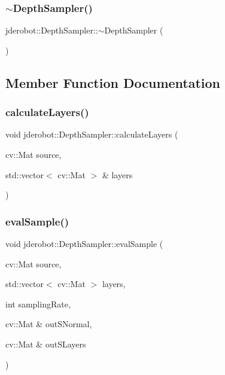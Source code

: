 \subsubsection{\texorpdfstring{$\sim$\+Depth\+Sampler()}{~DepthSampler()}}
{\footnotesize\ttfamily jderobot\+::\+Depth\+Sampler\+::$\sim$\+Depth\+Sampler (\begin{DoxyParamCaption}{ }\end{DoxyParamCaption})\hspace{0.3cm}{\ttfamily [virtual]}}



\subsection{Member Function Documentation}
\mbox{\label{classjderobot_1_1_depth_sampler_abd92df0e1e72431b2297344ff6d7dd78}} 
\subsubsection{\texorpdfstring{calculate\+Layers()}{calculateLayers()}}
{\footnotesize\ttfamily void jderobot\+::\+Depth\+Sampler\+::calculate\+Layers (\begin{DoxyParamCaption}\item[{cv\+::\+Mat}]{source,  }\item[{std\+::vector$<$ cv\+::\+Mat $>$ \&}]{layers }\end{DoxyParamCaption})}

\mbox{\label{classjderobot_1_1_depth_sampler_a208a3898c54c443647ad5116044041e8}} 
\subsubsection{\texorpdfstring{eval\+Sample()}{evalSample()}}
{\footnotesize\ttfamily void jderobot\+::\+Depth\+Sampler\+::eval\+Sample (\begin{DoxyParamCaption}\item[{cv\+::\+Mat}]{source,  }\item[{std\+::vector$<$ cv\+::\+Mat $>$}]{layers,  }\item[{int}]{sampling\+Rate,  }\item[{cv\+::\+Mat \&}]{out\+S\+Normal,  }\item[{cv\+::\+Mat \&}]{out\+S\+Layers }\end{DoxyParamCaption})}

